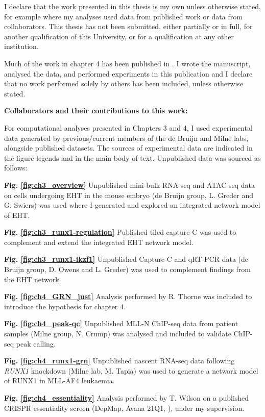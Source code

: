 I declare that the work presented in this thesis is my own unless otherwise stated, for example where my analyses used data from published work or data from collaborators. This thesis has not been submitted, either partially or in full, for another qualification of this University, or for a qualification at any other institution. 

\noindent
Much of the work in chapter 4 has been published in \cite{harman_kmt2a-aff1_2021}. I wrote the manuscript, analysed the data, and performed experiments in this publication and I declare that no work performed solely by others has been included, unless otherwise stated.

\noindent
\textbf{Collaborators and their contributions to this work:}

\noindent
For computational analyses presented in Chapters 3 and 4, I used experimental data generated by previous/current members of the de Bruijn and Milne labs, alongside published datasets. The sources of experimental data are indicated in the figure legends and in the main body of text. Unpublished data was sourced as follows:

\noindent
\textbf{Fig. \ref{fig:ch3_overview}} Unpublished mini-bulk RNA-seq and ATAC-seq data on cells undergoing EHT in the mouse embryo (de Bruijn group, L. Greder and G. Swiers) was used where I generated and explored an integrated network model of EHT.

\noindent
\textbf{Fig. \ref{fig:ch3_runx1-regulation}} Published tiled capture-C \citep{owens_dynamic_2022} was used to complement and extend the integrated EHT network model.

\noindent
\textbf{Fig. \ref{fig:ch3_runx1-ikzf1}} Unpublished Capture-C and qRT-PCR data (de Bruijn group, D. Owens and L. Greder) was used to complement findings from the EHT network.

\noindent
\textbf{Fig. \ref{fig:ch4_GRN_just}} Analysis performed by R. Thorne was included to introduce the hypothesis for chapter 4.

\noindent
\textbf{Fig. \ref{fig:ch4_peak-qc}} Unpublished MLL-N ChIP-seq data from patient samples (Milne group, N. Crump) was analysed and included to validate ChIP-seq peak calling.

\noindent
\textbf{Fig. \ref{fig:ch4_runx1-grn}} Unpublished nascent RNA-seq data following \textit{RUNX1} knockdown (Milne lab, M. Tapia) was used to generate a network model of RUNX1 in MLL-AF4 leukaemia.

\noindent
\textbf{Fig. \ref{fig:ch4_essentiality}} Analysis performed by T. Wilson on a published CRISPR essentiality screen (DepMap, Avana 21Q1, \cite{meyers_computational_2017, doench_optimized_2016}), under my supervision.

